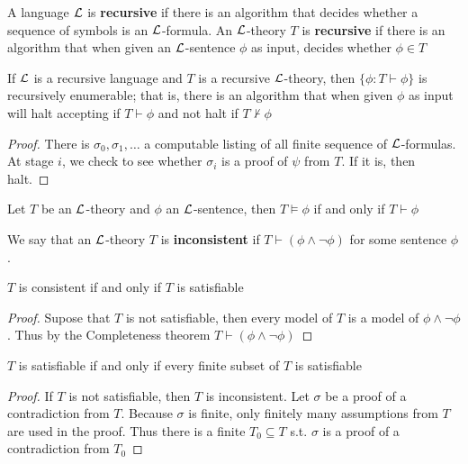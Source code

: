 \documentclass[11pt]{article}
\begin{document}
A language \(\mathcal{L}\) is \textbf{recursive} if there is an algorithm that decides
whether a sequence of symbols is an \(\mathcal{L}\)-formula. An \(\mathcal{L}\)-theory
\(T\) is \textbf{recursive} if there is an algorithm that when given an
\(\mathcal{L}\)-sentence \(\phi\) as input, decides whether \(\phi\in T\)

\begin{proposition}[]
\label{prop2.1.1}
If \(\mathcal{L}\) is a recursive language and \(T\) is a recursive \(\mathcal{L}\)-theory,
then \(\{\phi:T\vdash\phi\}\) is recursively enumerable; that is, there is an
algorithm that when given \(\phi\) as input will halt accepting if \(T\vdash\phi\)
and not halt if \(T\not\vdash\phi\)
\end{proposition}
\begin{proof}
There is \(\sigma_0,\sigma_1,\dots\) a computable listing of all finite
sequence of \(\mathcal{L}\)-formulas. At stage \(i\), we check to see whether
\(\sigma_i\) is a proof of \(\psi\) from \(T\). If it is, then halt.
\end{proof}

\begin{theorem}
Let \(T\) be an \(\mathcal{L}\)-theory and \(\phi\) an \(\mathcal{L}\)-sentence, then
\(T\vDash\phi\) if and only if \(T\vdash \phi\)
\end{theorem}

We say that an \(\mathcal{L}\)-theory \(T\) is \textbf{inconsistent} if
\(T\vdash(\phi\wedge\neg\phi)\) for some sentence \(\phi\).

\begin{corollary}[]
\(T\) is consistent if and only if \(T\) is satisfiable
\end{corollary}

\begin{proof}
Supose that \(T\) is not satisfiable, then every model of \(T\) is a model of
\(\phi\wedge\neg\phi\). Thus by the Completeness theorem
\(T\vdash(\phi\wedge\neg\phi)\) 
\end{proof}


\begin{theorem}
\(T\) is satisfiable if and only if every finite subset of \(T\) is satisfiable
\end{theorem}

\begin{proof}
If \(T\) is not satisfiable, then \(T\) is inconsistent. Let \(\sigma\) be a proof of
a contradiction from  \(T\). Because \(\sigma\) is finite, only finitely many
assumptions from \(T\) are used in the proof. Thus there is a finite
\(T_0\subseteq T\) s.t. \(\sigma\) is a proof of a contradiction from \(T_0\)
\end{proof}
\end{document}
